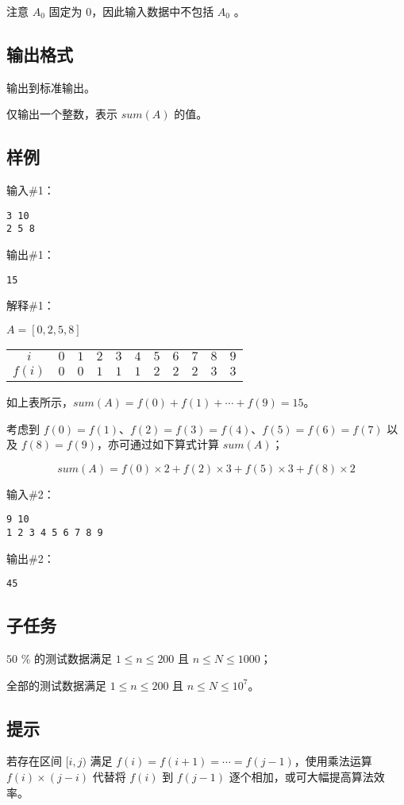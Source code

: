 注意 $A_0$
 固定为 $0$，因此输入数据中不包括 $A_0$ 
。

\subsection*{输出格式}

输出到标准输出。

仅输出一个整数，表示 $sum(A)$ 的值。

\subsection*{样例}

输入\#1：

\begin{lstlisting}
3 10
2 5 8
\end{lstlisting}

输出\#1：

\begin{lstlisting}
15
\end{lstlisting}

解释\#1：

$A=[0, 2, 5, 8]$

\begin{table}[H]
  \centering
  \begin{tabular}{ccccccccccc}
    \toprule
    $i$ & $0$ & $1$ & $2$ & $3$ & $4$ & $5$ & $6$ & $7$ & $8$ & $9$ \\
    $f(i)$ & $0$ & $0$ & $1$ & $1$ & $1$ & $2$ & $2$ & $2$ & $3$ & $3$ \\
    \bottomrule
  \end{tabular}
\end{table}

如上表所示，$sum(A)=f(0)+f(1)+\cdots + f(9)=15$。

考虑到 $f(0)=f(1)$、$f(2)=f(3)=f(4)$、$f(5)=f(6)=f(7)$ 以及 $f(8)=f(9)$，亦可通过如下算式计算 $sum(A)$；

\begin{equation*}
  sum(A)=f(0)\times 2+f(2)\times 3+f(5)\times 3 + f(8)\times 2
\end{equation*}

输入\#2：

\begin{lstlisting}
9 10
1 2 3 4 5 6 7 8 9
\end{lstlisting}

输出\#2：

\begin{lstlisting}
45
\end{lstlisting}

\subsection*{子任务}

$50$ \% 的测试数据满足 $1\le n\le 200$ 且 $n\le N\le 1000$；

全部的测试数据满足 $1\le n\le 200$ 且 $n\le N\le 10^7$。

\subsection*{提示}

若存在区间 $[i,j)$ 满足 $f(i)=f(i+1)=\cdots=f(j-1)$，使用乘法运算 $f(i)\times (j-i)$ 代替将 $f(i)$ 到 $f(j-1)$ 逐个相加，或可大幅提高算法效率。
